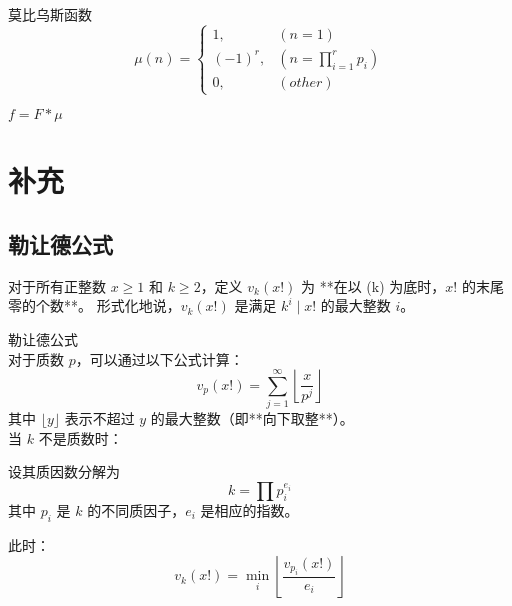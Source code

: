 \begin{definition}
  莫比乌斯函数\\
  \[
  \mu(n)=\begin{cases}
    1,& (n=1)\\
    (-1)^r,& (n=\prod_{i=1}^{r}p_i)\\
    0,& (other)
    \end{cases}
  \]
\end{definition}

\begin{theorem}
  $f=F*\mu$
\end{theorem}

\section{补充}
\subsection{勒让德公式}
\begin{definition}
  对于所有正整数 \(x \ge 1\) 和 \(k \ge 2\)，定义 \(v_k(x!)\) 为 **在以 (k) 为底时，\(x!\) 的末尾零的个数**。
  形式化地说，\(v_k(x!)\) 是满足 \(k^i \mid x!\) 的最大整数 \(i\)。
\end{definition}

\begin{theorem}勒让德公式\\
  对于质数 \(p\)，可以通过以下公式计算：
 \[
 v_p(x!) = \sum_{j=1}^\infty \left\lfloor \frac{x}{p^j} \right\rfloor
 \]
 其中 \(\lfloor y \rfloor\) 表示不超过 \(y\) 的最大整数（即**向下取整**）。\\
 当 \(k\) 不是质数时：

设其质因数分解为
$$
 k = \prod p_i^{e_i}
$$
 其中 \(p_i\) 是 \(k\) 的不同质因子，\(e_i\) 是相应的指数。

此时：
$$
 v_k(x!) = \min_i \left\lfloor \frac{v_{p_i}(x!)}{e_i} \right\rfloor
$$

\end{theorem}

